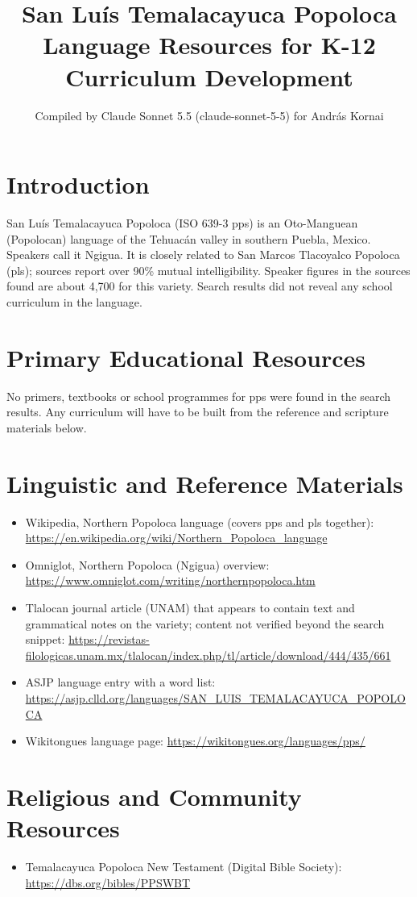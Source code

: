 \documentclass[12pt]{article}
\title{San Luís Temalacayuca Popoloca Language Resources for K-12 Curriculum Development}
\author{Compiled by Claude Sonnet 5.5 (claude-sonnet-5-5) for Andr\'as Kornai}
\date{}
\begin{document}
\maketitle
\section{Introduction}
San Luís Temalacayuca Popoloca (ISO 639-3 pps) is an Oto-Manguean (Popolocan) language of the Tehuacán valley in southern Puebla, Mexico. Speakers call it Ngigua. It is closely related to San Marcos Tlacoyalco Popoloca (pls); sources report over 90\% mutual intelligibility. Speaker figures in the sources found are about 4,700 for this variety. Search results did not reveal any school curriculum in the language.
\section{Primary Educational Resources}
No primers, textbooks or school programmes for pps were found in the search results. Any curriculum will have to be built from the reference and scripture materials below.
\section{Linguistic and Reference Materials}
\begin{itemize}
\item Wikipedia, Northern Popoloca language (covers pps and pls together): \url{https://en.wikipedia.org/wiki/Northern_Popoloca_language}
\item Omniglot, Northern Popoloca (Ngigua) overview: \url{https://www.omniglot.com/writing/northernpopoloca.htm}
\item Tlalocan journal article (UNAM) that appears to contain text and grammatical notes on the variety; content not verified beyond the search snippet: \url{https://revistas-filologicas.unam.mx/tlalocan/index.php/tl/article/download/444/435/661}
\item ASJP language entry with a word list: \url{https://asjp.clld.org/languages/SAN_LUIS_TEMALACAYUCA_POPOLOCA}
\item Wikitongues language page: \url{https://wikitongues.org/languages/pps/}
\end{itemize}
\section{Religious and Community Resources}
\begin{itemize}
\item Temalacayuca Popoloca New Testament (Digital Bible Society): \url{https://dbs.org/bibles/PPSWBT}
\end{itemize}
\end{document}
